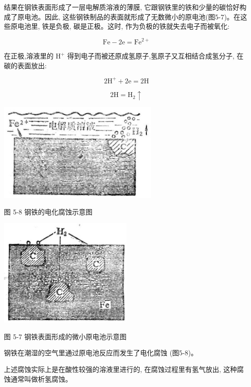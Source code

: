 \documentclass[10pt]{article}
\begin{document}
结果在钢铁表面形成了一层电解质溶液的薄膜, 它跟钢铁里的铁和少量的碳恰好构成了原电池。因此, 这些钢铁制品的表面就形成了无数微小的原电池(图5-7)。在这些原电池里, 铁是负极, 碳是正极。这时, 作为负极的铁就失去电子而被氧化:

\[
\mathrm{{Fe}} - 2\mathrm{e} = {\mathrm{{Fe}}}^{2 + }
\]

在正极,溶液里的 \({\mathrm{H}}^{ + }\) 得到电子而被还原成氢原子,氢原子又互相结合成氢分子, 在碳的表面放出:

\[
2{\mathrm{H}}^{ + } + 2\mathrm{e} = 2\mathrm{H}
\]

\[
2\mathrm{H} = {\mathrm{H}}_{2} \uparrow
\]

\begin{center}
\includegraphics[max width=0.6\textwidth]{images/01912d13-9986-7822-a012-3f3f7be99dcb_161_776309.jpg}
\end{center}

图 5-8 钢铁的电化腐蚀示意图

\begin{center}
\includegraphics[max width=0.5\textwidth]{images/01912d13-9986-7822-a012-3f3f7be99dcb_161_822593.jpg}
\end{center}

图 5-7 钢铁表面形成的微小原电池示意图

钢铁在潮湿的空气里通过原电池反应而发生了电化腐蚀 (图5-8)。

上述腐蚀实际上是在酸性较强的溶液里进行的, 在腐蚀过程里有氢气放出, 这种腐蚀通常叫做析氢腐蚀。
\end{document}
